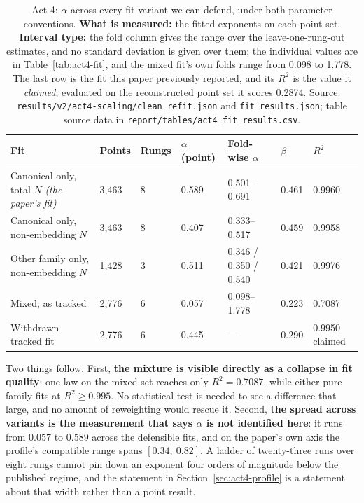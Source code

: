 \documentclass[11pt,a4paper]{article}
\begin{document}
\begin{table}[H]
\centering
\begin{tabular}{L{3.5cm}R{1.4cm}R{1.1cm}R{1.6cm}R{2.5cm}R{1.3cm}R{1.6cm}}
\toprule
Fit & Points & Rungs & $\alpha$ (point) & Fold-wise $\alpha$ & $\beta$ & $R^2$ \\
\midrule
Canonical only, total $N$ \emph{(the paper's fit)} & 3,463 & 8 & 0.589 & 0.501--0.691 & 0.461 & 0.9960 \\
Canonical only, non-embedding $N$ & 3,463 & 8 & 0.407 & 0.333--0.517 & 0.459 & 0.9958 \\
Other family only, non-embedding $N$ & 1,428 & 3 & 0.511 & 0.346 / 0.350 / 0.540 & 0.421 & 0.9976 \\
Mixed, as tracked & 2,776 & 6 & 0.057 & 0.098--1.778 & 0.223 & 0.7087 \\
\midrule
Withdrawn tracked fit & 2,776 & 6 & 0.445 & --- & 0.290 & 0.9950 claimed \\
\bottomrule
\end{tabular}
\caption{Act 4: $\alpha$ across every fit variant we can defend, under both
parameter conventions. \textbf{What is measured:} the fitted exponents on each
point set. \textbf{Interval type:} the fold column gives the range over the
leave-one-rung-out estimates, and no standard deviation is
given over them; the individual values are in Table~\ref{tab:act4-fit}, and the
mixed fit's own folds range from 0.098 to 1.778. The last
row is the fit this paper previously reported, and its $R^2$ is the value it
\emph{claimed}; evaluated on the reconstructed point set it scores 0.2874.
Source: \texttt{results/v2/act4-scaling/clean\_refit.json} and
\texttt{fit\_results.json}; table source data in
\texttt{report/tables/act4\_fit\_results.csv}.}
\label{tab:act4-variants}
\end{table}

Two things follow. First, \textbf{the mixture is visible directly as a
collapse in fit quality}: one law on the mixed set reaches only
$R^2 = 0.7087$, while either pure family fits at $R^2 \geq 0.995$. No
statistical test is needed to see a difference that large, and no amount of
reweighting would rescue it. Second, \textbf{the spread across variants is
the measurement that says $\alpha$ is not identified here}: it runs from
$0.057$ to $0.589$ across the defensible fits, and on the paper's own
axis the profile's compatible range spans $[0.34,\ 0.82]$. A ladder of
twenty-three runs over eight rungs cannot pin down an exponent four orders of
magnitude below the published regime, and the statement in
Section~\ref{sec:act4-profile} is a statement about that width rather than a
point result. %
\end{document}
